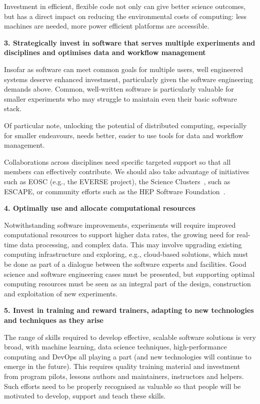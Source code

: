 Investment in efficient, flexible code not only can give better science outcomes, but has a direct impact on reducing the environmental costs of computing: less machines are needed, more power efficient platforms are accessible.

{\bf 3. Strategically invest in software that serves multiple experiments and disciplines and optimises data and workflow management}

Insofar as software can meet common goals for multiple users, well engineered systems deserve enhanced investment, particularly given the software engineering demands above. Common, well-written software is particularly valuable for smaller experiments who may struggle to maintain even their basic software stack.

Of particular note, unlocking the potential of distributed computing, especially for smaller endeavours, needs better, easier to use tools for data and workflow management.

Collaborations across disciplines need specific targeted support so that all members can effectively contribute. We should also take advantage of initiatives such as EOSC (e.g., the EVERSE project), the Science Clusters~\cite{ScienceClusters}, such as ESCAPE, or community efforts such as the HEP Software Foundation~\cite{HSF}.

{\bf 4. Optimally use and allocate computational resources}

Notwithstanding software improvements, experiments will require improved computational resources to support higher data rates, the growing need for real-time data processing, and complex data. This may involve upgrading existing computing infrastructure and exploring, e.g., cloud-based solutions, which must be done as part of a dialogue between the software experts and facilities. Good science and software engineering cases must be presented, but supporting optimal computing resources must be seen as an integral part of the design, construction and exploitation of new experiments.

{\bf 5. Invest in training and reward trainers, adapting to new technologies and techniques as they arise}

The range of skills required to develop effective, scalable software solutions is very broad, with machine learning, data science techniques, high-performance computing and DevOps all playing a part (and new technologies will continue to emerge in the future). This requires quality training material and investment from program pilots, lessons authors and maintainers, instructors and helpers. Such efforts need to be properly recognised as valuable so that people will be motivated to develop, support and teach these skills.

